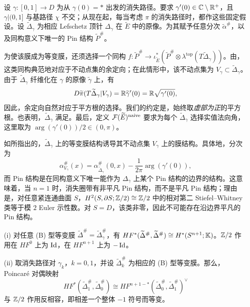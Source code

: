 \begin{description}[leftmargin=2em]
\item[(B) 型。]\mbox{}\par 设 $\gamma:[0,1]\to D$ 为从 $\gamma(0)=*$ 出发的消失路径。要求 $\gamma'(0)\in\mathbb C\setminus\mathbb R^+$，且 $\gamma|(0,1]$ 与基路径 $\chi$ 不交；从现在起，每当考虑 $\pi$ 的消失路径时，都作这些固定假设。设 $\widetilde\Delta_\gamma$ 为相应 Lefschetz 顶针 $\Delta_\gamma$ 在 $\widetilde E$ 中的原像。为其赋予任意分次 $\widetilde\alpha^\#$，以及同构意义下唯一的 Pin 结构 $\widetilde P^\#$。

为使该膜成为等变膜，还须选择一个同构 $f:\widetilde P^\#\to\iota_{\widetilde E}^*(\widetilde P^\#\otimes\lambda^{\mathrm{top}}(T\widetilde\Delta_\gamma))$。由，这类同构典范地对应于不动点集的余定向；在此情形中，该不动点集为 $V_\gamma\subset\widetilde\Delta_\gamma$。由于 $\widetilde\Delta_\gamma$ 纤维化在 $\gamma$ 的原像 $\widetilde\gamma$ 上，有
\begin{equation}\label{eq:18.21}
D\widetilde\pi(T\widetilde\Delta_\gamma|V_\gamma)=\mathbb R\widetilde\gamma'(0)=\mathbb R\sqrt{\gamma'(0)},
\end{equation}
因此，余定向自然对应于平方根的选择。我们的约定是，始终取\emph{虚部为正}的平方根。也表明，$\widetilde\Delta_\gamma$ 满足。最后，定义 $\mathcal F(\widetilde E)^{\mathrm{naive}}$ 要求为每个 $\widetilde\Delta_\gamma$ 选择实值法向角，这里取为 $\arg(\gamma'(0))/2\in(0,\pi)$。

如所指出的，$\widetilde\Delta_\gamma$ 上的等变膜结构诱导其不动点集 $V_\gamma$ 上的膜结构。具体地，分次为
\[
\alpha^\#_{V_\gamma}(x)=\alpha^\#_{\widetilde\Delta_\gamma}(0,x)-\frac1{2\pi}\arg(\gamma'(0)),
\]
而 Pin 结构是在同构意义下唯一能作为 $\Delta_\gamma$ 上某个 Pin 结构的边界的结构。这意味着，当 $n=1$ 时，消失圈带有非平凡 Pin 结构，而不是平凡 Pin 结构；理由是，对任意紧连通曲面 $S$，$H^2(S,\partial S;\mathbb Z/2)\cong\mathbb Z/2$ 中的相对第二 Stiefel–Whitney 类等于模 $2$ Euler 示性数。对 $S=D$，该类非零，因此不可能存在沿边界平凡的 Pin 结构。
\end{description}
\begin{lemma}\label{st:18.9}
(i) 对任意 (B) 型等变膜 $\widetilde\Delta^\#=\widetilde\Delta_\gamma^\#$，有 $HF^*(\widetilde\Delta^\#,\widetilde\Delta^\#)\cong H^*(S^{n+1};\mathbb K)$。$\mathbb Z/2$ 作用在 $HF^0$ 上为 $\operatorname{Id}$，在 $HF^{n+1}$ 上为 $-\operatorname{Id}$。

(ii) 取消失路径对 $\gamma_k$，$k=0,1$，并设 $\widetilde\Delta_k^\#$ 为相应的 (B) 型等变膜。那么，Poincaré 对偶映射
\[
HF^*(\widetilde\Delta_1^\#,\widetilde\Delta_0^\#)\cong HF^{n+1-*}(\widetilde\Delta_0^\#,\widetilde\Delta_1^\#)^\vee
\]
与 $\mathbb Z/2$ 作用反相容，即相差一个整体 $-1$ 符号而等变。
\end{lemma}
